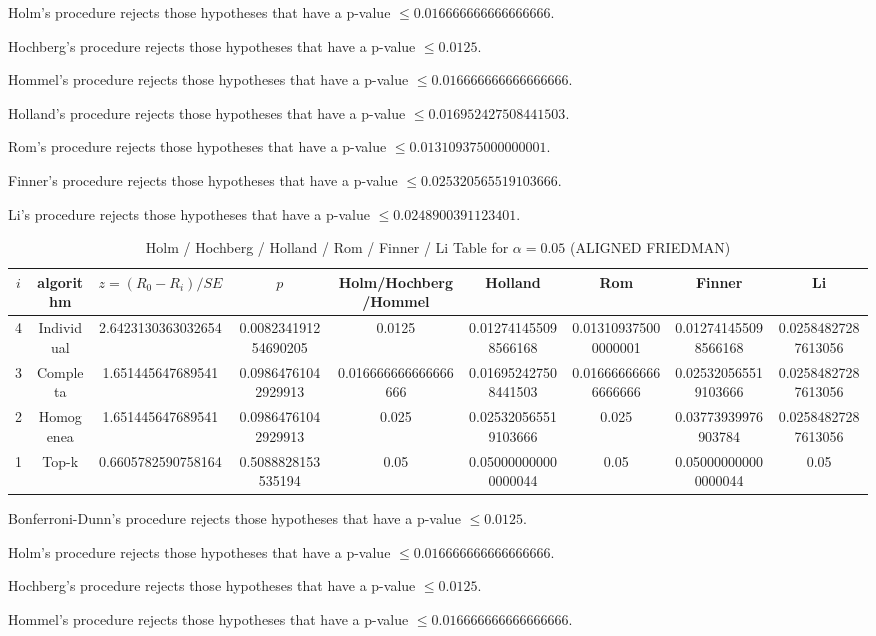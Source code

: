 \documentclass[a4paper,10pt]{article}
\begin{document}
\begin{landscape}
Holm's procedure rejects those hypotheses that have a p-value $\le0.016666666666666666$.


Hochberg's procedure rejects those hypotheses that have a p-value $\le0.0125$.


Hommel's procedure rejects those hypotheses that have a p-value $\le0.016666666666666666$.


Holland's procedure rejects those hypotheses that have a p-value $\le0.016952427508441503$.


Rom's procedure rejects those hypotheses that have a p-value $\le0.013109375000000001$.


Finner's procedure rejects those hypotheses that have a p-value $\le0.025320565519103666$.


Li's procedure rejects those hypotheses that have a p-value $\le0.0248900391123401$.



\newpage

\begin{table}[!htp]
\centering\scriptsize
\caption{Holm / Hochberg / Holland / Rom / Finner / Li Table for $\alpha=0.05$ (ALIGNED FRIEDMAN)}
\begin{tabular}{ccccccccc}
$i$&algorithm&$z=(R_0 - R_i)/SE$&$p$&Holm/Hochberg/Hommel&Holland&Rom&Finner&Li\\
\hline
4&Individual&2.6423130363032654&0.008234191254690205&0.0125&0.012741455098566168&0.013109375000000001&0.012741455098566168&0.02584827287613056\\
3&Completa&1.651445647689541&0.09864761042929913&0.016666666666666666&0.016952427508441503&0.016666666666666666&0.025320565519103666&0.02584827287613056\\
2&Homogenea&1.651445647689541&0.09864761042929913&0.025&0.025320565519103666&0.025&0.03773939976903784&0.02584827287613056\\
1&Top-k&0.6605782590758164&0.5088828153535194&0.05&0.050000000000000044&0.05&0.050000000000000044&0.05\\
\hline
\end{tabular}
\end{table}
Bonferroni-Dunn's procedure rejects those hypotheses that have a p-value $\le0.0125$.


Holm's procedure rejects those hypotheses that have a p-value $\le0.016666666666666666$.


Hochberg's procedure rejects those hypotheses that have a p-value $\le0.0125$.


Hommel's procedure rejects those hypotheses that have a p-value $\le0.016666666666666666$.



\end{landscape}
\end{document}
